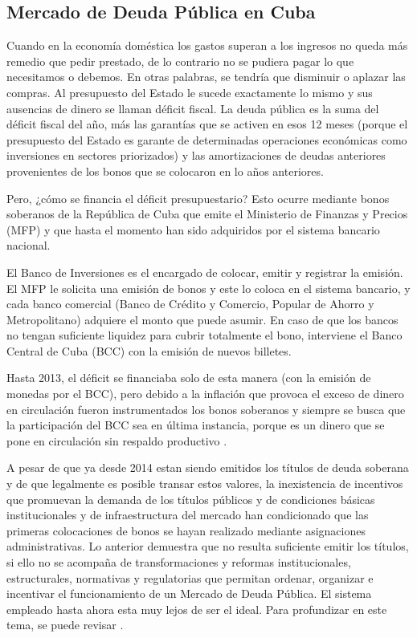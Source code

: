   \subsection{Mercado de Deuda Pública en Cuba} \hspace*{}

    Cuando en la economía doméstica los gastos superan a los ingresos no queda más remedio que pedir prestado, de lo contrario 
    no se pudiera pagar lo que necesitamos o debemos. En otras palabras, se tendría que disminuir o aplazar las compras. Al presupuesto del 
    Estado le sucede exactamente lo mismo y sus ausencias de dinero se llaman déficit fiscal. La deuda pública es la suma del déficit 
    fiscal del año, más las garantías que se activen en esos 12 meses (porque el presupuesto del Estado es garante de determinadas 
    operaciones económicas como inversiones en sectores priorizados) y las amortizaciones de deudas anteriores provenientes de los bonos 
    que se colocaron en lo años anteriores.

    Pero, ¿cómo se financia el déficit presupuestario? Esto ocurre mediante bonos soberanos de la República de 
    Cuba que emite el Ministerio de Finanzas y Precios (MFP) y que hasta el momento han sido adquiridos por el sistema bancario nacional.

    El Banco de Inversiones es el encargado de colocar, emitir y registrar la emisión. El MFP le solicita una emisión de bonos y este lo 
    coloca en el sistema bancario, y cada banco comercial (Banco de Crédito y Comercio, Popular de Ahorro y Metropolitano) adquiere el 
    monto que puede asumir. En caso de que los bancos no tengan suficiente liquidez para cubrir totalmente el bono, interviene el Banco 
    Central de Cuba (BCC) con la emisión de nuevos billetes.

    Hasta 2013, el déficit se financiaba solo de esta manera (con la emisión de monedas por el BCC), pero debido a la inflación que 
    provoca el exceso de dinero en circulación fueron instrumentados los bonos soberanos y siempre se busca que la participación del 
    BCC sea en última instancia, porque es un dinero que se pone en circulación sin respaldo productivo \parencite{carmona2021}. 

    A pesar de que ya desde 2014 estan siendo emitidos los títulos de deuda soberana y de que legalmente es posible transar estos valores, 
    la inexistencia de incentivos que promuevan la demanda de los títulos públicos y de condiciones básicas institucionales y de
    infraestructura del mercado han condicionado que las primeras colocaciones de bonos se hayan realizado mediante asignaciones 
    administrativas. Lo anterior demuestra que no resulta suficiente emitir los títulos, si ello no se acompaña de transformaciones y
    reformas institucionales, estructurales, normativas y regulatorias que permitan ordenar,
    organizar e incentivar el funcionamiento de un Mercado de Deuda Pública. El sistema empleado hasta ahora
    esta muy lejos de ser el ideal. Para profundizar en este tema, se puede revisar \parencite{barcelo2017}.

